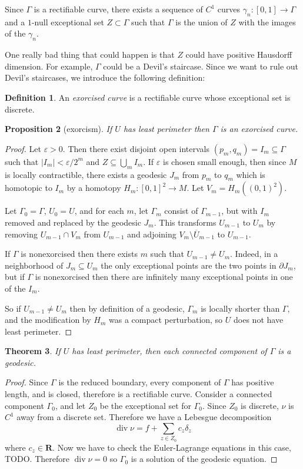 \documentclass[reqno,12pt,letterpaper]{amsart}
\newcommand{\RR}{\mathbf{R}}
\DeclareMathOperator{\Div}{div}
\newcommand{\dfn}[1]{\emph{#1}\index{#1}}
\newtheorem{theorem}{Theorem}[section]
\newtheorem{proposition}[theorem]{Proposition}
\theoremstyle{definition}
\newtheorem{definition}[theorem]{Definition}
\numberwithin{equation}{section}
\begin{document}
Since $\Gamma$ is a rectifiable curve, there exists a sequence of $C^1$ curves $\gamma_n: [0, 1] \to \Gamma$ and a $1$-null exceptional set $Z \subset \Gamma$ such that $\Gamma$ is the union of $Z$ with the images of the $\gamma_n$.

One really bad thing that could happen is that $Z$ could have positive Hausdorff dimension.
For example, $\Gamma$ could be a Devil's staircase.
Since we want to rule out Devil's staircases, we introduce the following definition:

\begin{definition}
An \dfn{exorcised curve} is a rectifiable curve whose exceptional set is discrete.
\end{definition}

\begin{proposition}[exorcism]
If $U$ has least perimeter then $\Gamma$ is an exorcised curve.
\end{proposition}
\begin{proof}
Let $\varepsilon > 0$.
Then there exist disjoint open intervals $(p_m, q_m) = I_m \subseteq \Gamma$ such that $|I_m| < \varepsilon/2^m$ and $Z \subseteq \bigcup_m I_m$.
If $\varepsilon$ is chosen small enough, then since $M$ is locally contractible, there exists a geodesic $J_m$ from $p_m$ to $q_m$ which is homotopic to $I_m$ by a homotopy $H_m: [0, 1]^2 \to M$.
Let $V_m = H_m((0, 1)^2)$.

Let $\Gamma_0 = \Gamma$, $U_0 = U$, and for each $m$, let $\Gamma_m$ consist of $\Gamma_{m - 1}$, but with $I_m$ removed and replaced by the geodesic $J_m$.
This transforms $U_{m - 1}$ to $U_m$ by removing $U_{m - 1} \cap V_m$ from $U_{m - 1}$ and adjoining $V_m \setminus \overline U_{m - 1}$ to $U_{m - 1}$.

If $\Gamma$ is nonexorcised then there exists $m$ such that $U_{m - 1} \neq U_m$.
Indeed, in a neighborhood of $J_m \subseteq U_m$ the only exceptional points are the two points in $\partial J_m$, but if $\Gamma$ is nonexorcised then there are infinitely many exceptional points in one of the $I_m$.

So if $U_{m - 1} \neq U_m$ then by definition of a geodesic, $\Gamma_m$ is locally shorter than $\Gamma$, and the modification by $H_m$ was a compact perturbation, so $U$ does not have least perimeter.
\end{proof}

\begin{theorem}
If $U$ has least perimeter, then each connected component of $\Gamma$ is a geodesic.
\end{theorem}
\begin{proof}
Since $\Gamma$ is the reduced boundary, every component of $\Gamma$ has positive length, and is closed, therefore is a rectifiable curve.
Consider a connected component $\Gamma_0$, and let $Z_0$ be the exceptional set for $\Gamma_0$.
Since $Z_0$ is discrete, $\nu$ is $C^1$ away from a discrete set. Therefore we have a Lebesgue decomposition
$$\Div \nu = f + \sum_{z \in Z_0} c_z \delta_z$$
where $c_z \in \RR$.
Now we have to check the Euler-Lagrange equations in this case, TODO.
Therefore $\Div \nu = 0$ so $\Gamma_0$ is a solution of the geodesic equation.
\end{proof}



\printbibliography
\end{document}
